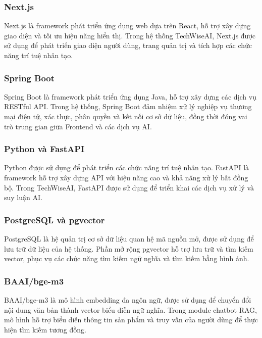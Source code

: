 \documentclass{report}
\begin{document}
\subsubsection{Next.js}

Next.js là framework phát triển ứng dụng web
dựa trên React, hỗ trợ xây dựng giao diện
và tối ưu hiệu năng hiển thị. Trong hệ thống
TechWiseAI, Next.js được sử dụng để phát triển
giao diện người dùng, trang quản trị và tích hợp
các chức năng trí tuệ nhân tạo.

\subsubsection{Spring Boot}

Spring Boot là framework phát triển ứng dụng
Java, hỗ trợ xây dựng các dịch vụ RESTful API.
Trong hệ thống, Spring Boot đảm nhiệm xử lý
nghiệp vụ thương mại điện tử, xác thực,
phân quyền và kết nối cơ sở dữ liệu,
đồng thời đóng vai trò trung gian
giữa Frontend và các dịch vụ AI.

\subsubsection{Python và FastAPI}

Python được sử dụng để phát triển các chức năng
trí tuệ nhân tạo. FastAPI là framework hỗ trợ
xây dựng API với hiệu năng cao và khả năng
xử lý bất đồng bộ. Trong TechWiseAI,
FastAPI được sử dụng để triển khai
các dịch vụ xử lý và suy luận AI.

\subsubsection{PostgreSQL và pgvector}

PostgreSQL là hệ quản trị cơ sở dữ liệu
quan hệ mã nguồn mở, được sử dụng để
lưu trữ dữ liệu của hệ thống.
Phần mở rộng pgvector hỗ trợ lưu trữ
và tìm kiếm vector, phục vụ các chức năng
tìm kiếm ngữ nghĩa và tìm kiếm bằng hình ảnh.

\subsubsection{BAAI/bge-m3}

BAAI/bge-m3 là mô hình embedding đa ngôn ngữ,
được sử dụng để chuyển đổi nội dung văn bản
thành vector biểu diễn ngữ nghĩa.
Trong module chatbot RAG, mô hình hỗ trợ
biểu diễn thông tin sản phẩm và truy vấn
của người dùng để thực hiện tìm kiếm tương đồng.
\end{document}
